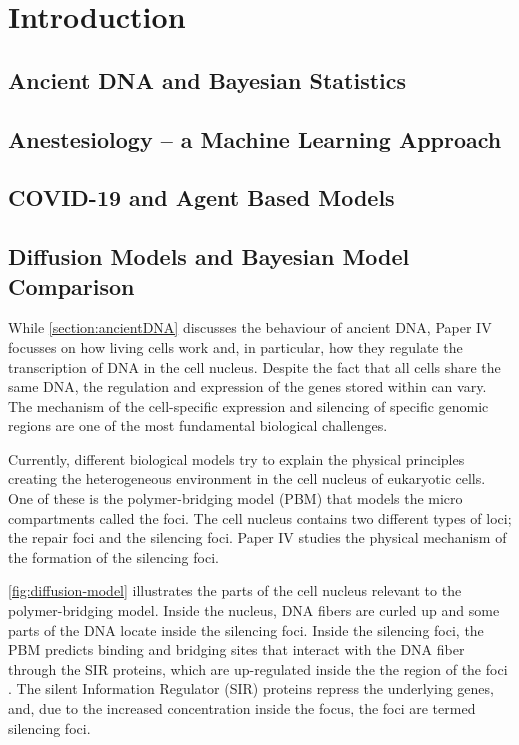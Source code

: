 
\chapter{Introduction}
\label{chapter:introduction}



\section{Ancient DNA and Bayesian Statistics}
\label{section:ancientDNA}



\section{Anestesiology -- a Machine Learning Approach }
\label{section:machine-learning}


\section{COVID-19 and Agent Based Models}
\label{section:agent-based-models}


\section{Diffusion Models and Bayesian Model Comparison}
\label{section:diffusion}

While \autoref{section:ancientDNA} discusses the behaviour of ancient DNA, Paper IV focusses on how living cells work and, in particular, how they regulate the transcription of DNA in the cell nucleus.
Despite the fact that all cells share the same DNA, the regulation and expression of the genes stored within can vary. The mechanism of the cell-specific expression and silencing of specific genomic regions are one of the most fundamental biological challenges.

Currently, different biological models try to explain the physical principles creating the heterogeneous environment in the cell nucleus of eukaryotic cells.
One of these is the polymer-bridging model (PBM) that models the micro compartments called the foci. The cell nucleus contains two different types of loci; the repair foci and the silencing foci. Paper IV studies the physical mechanism of the formation of the silencing foci.

\autoref{fig:diffusion-model} illustrates the parts of the cell nucleus relevant to the polymer-bridging model. Inside the nucleus, DNA fibers are curled up and some parts of the DNA locate inside the silencing foci. Inside the silencing foci, the PBM predicts binding and bridging sites that interact with the DNA fiber through the SIR proteins, which are up-regulated inside the the region of the foci \autocite{heltbergPhysicalObservablesDetermine2021}. The silent Information Regulator (SIR) proteins repress the underlying genes, and, due to the increased concentration inside the focus, the foci are termed silencing foci.

